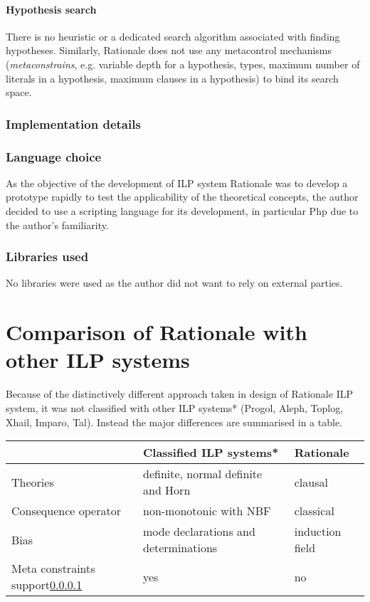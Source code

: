 \paragraph{Hypothesis search}\label{subsec:rationale_hypothesis_search}
There is no heuristic or a dedicated search algorithm associated with finding hypotheses. Similarly, Rationale does not use any metacontrol mechanisms (\emph{metaconstrains}, e.g. variable depth for a hypothesis, types, maximum number of literals in a hypothesis, maximum clauses in a hypothesis) to bind its search space.

\subsubsection{Implementation details}

\subsubsection{Language choice}
As the objective of the development of ILP system Rationale was to develop a prototype rapidly to test the applicability of the theoretical concepts, the author decided to use a scripting language for its development, in particular Php due to the author's familiarity.

\subsubsection{Libraries used}
No libraries were used as the author did not want to rely on external parties.

\section{Comparison of Rationale with other ILP systems}
Because of the distinctively different approach taken in design of Rationale ILP system, it was not classified with other ILP systems* (Progol, Aleph, Toplog, Xhail, Imparo, Tal). Instead the major differences are summarised in a table.


\begin{tabular}{| l | l | l |}
\hline
 & Classified ILP systems* & Rationale \\
\hline
  Theories & definite, normal definite and Horn & clausal \\ \hline
  Consequence operator & non-monotonic with NBF & classical \\ \hline
  Bias & mode declarations and determinations & induction field \\ \hline
  Meta constraints support\ref{subsec:rationale_hypothesis_search} & yes & no\\
\hline
\end{tabular}